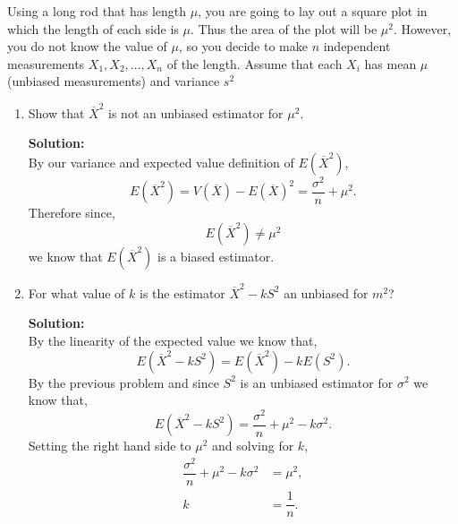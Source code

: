 \documentclass[12pt]{article}
\makeatletter
\theoremstyle{homework}
\newenvironment{exercise}[1]
{\def\@currentlabel{#1}\exercisecore}
{\endexercisecore}
\newcommand{\localhead}[1]{\par\smallskip\noindent\textbf{#1}\nobreak\\}%
\newcommand\solution{\localhead{Solution:}}
\makeatother
\begin{document}
\begin{exercise}{6.10}  Using a long rod that has length $\mu$, you are going to lay out  a  square  plot  in  which 
   the  length  of  each  side  is  $\mu$. Thus the area of the plot will be $\mu^2$. However, you do not know the value
    of $\mu$, so you decide to make $n$ indepen­dent measurements $X_1, X_2,  ... , X_n$ of the length. 
    Assume that  each  $X_i$  has  mean  $\mu$  (unbiased  measurements)  and  variance $s^2$\\
    \begin{enumerate}
      \item Show that $\overline{X}^2$ is not an unbiased estimator for $\mu^2$.\\
      \solution By our variance and expected value definition of $E(\overline{X}^2)$, 
      \begin{equation*}
        E(\overline{X}^2) = V(\overline{X}) - E(\overline{X})^2 = \dfrac{\sigma^2}{n} + \mu^2.
      \end{equation*}
      Therefore since,
      \begin{equation*}
        E(\overline{X}^2) \neq \mu^2
      \end{equation*}
      we know that $E(\overline{X}^2)$ is a biased estimator.
      \vspace{.25in}


      \item   For  what  value  of  $k$  is  the  estimator  $\overline{X}^2 - kS^2$ an unbiased for $m^2$?\\
      \solution By the linearity of the expected value we know that,
      \begin{equation*}
        E(\overline{X}^2 - kS^2) = E(\overline{X}^2) - kE(S^2).  
      \end{equation*}
      By the previous problem and since $S^2$ is an unbiased estimator for $\sigma^2$ we know that,
      \begin{equation*}
        E(\overline{X}^2 - kS^2) = \dfrac{\sigma^2}{n} + \mu^2 - k\sigma^2.
      \end{equation*}
      Setting the right hand side to $\mu^2$ and solving for $k$,
      \begin{align*}
        \dfrac{\sigma^2}{n} + \mu^2 - k\sigma^2 &= \mu^2,\\
        k &= \dfrac{1}{n}.
      \end{align*}
    \end{enumerate}
\end{exercise}
\vspace{.5in}
\end{document}
